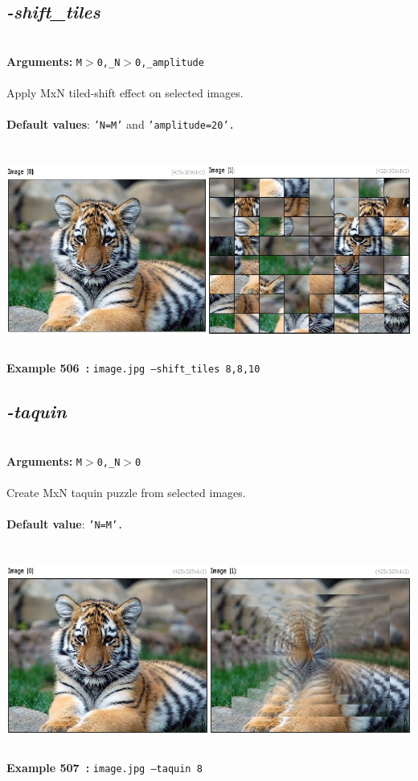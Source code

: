 \documentclass[a4paper,11pt,twoside]{book}
\begin{document}
\subsection{\emph{-shift\_tiles} }\vspace*{-0.5em}
~\\\textbf{Arguments: } 
{\small \texttt{M$>$0,\_N$>$0,\_amplitude}}\\~\\
Apply MxN tiled-shift effect on selected images.
~\\~\\\textbf{Default values}: {\small \texttt{'N=M'} and \texttt{'amplitude=20'.}}
\begin{center}\includegraphics[keepaspectratio=true,height=7cm,width=\textwidth]{img/gmic_def506.jpg}\\
{\footnotesize \textbf{Example 506~:} \texttt{image.jpg --shift\_tiles 8,8,10}}
\end{center}

\subsection{\emph{-taquin} }\vspace*{-0.5em}
~\\\textbf{Arguments: } 
{\small \texttt{M$>$0,\_N$>$0}}\\~\\
Create MxN taquin puzzle from selected images.
~\\~\\\textbf{Default value}: {\small \texttt{'N=M'.}}
\begin{center}\includegraphics[keepaspectratio=true,height=7cm,width=\textwidth]{img/gmic_def507.jpg}\\
{\footnotesize \textbf{Example 507~:} \texttt{image.jpg --taquin 8}}
\end{center}
\end{document}
